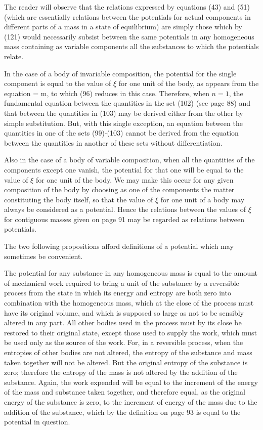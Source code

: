 \documentclass[12pt]{article}
\begin{document}
The reader will observe that the relations expressed by equations (43) and (51) (which are essentially relations between the potentials for actual components in different parts of a mass in a state of equilibrium) are simply those which by (121) would necessarily subsist between the same potentials in any homogeneous mass containing as variable components all the substances to which the potentials relate.


In the case of a body of invariable composition, the potential for the single component is equal to the value of $\xi$ for one unit of the body, as appears from the equation
\eqs \xi= \mu m,  \label{122}\eqe
to which (96) reduces in this case. Therefore, when $n = 1$, the fundamental equation between the quantities in the set (102) (see page 88) and that between the quantities in (103) may be derived either from the other by simple substitution. But, with this single exception, an equation between the quantities in one of the sets (99)-(103) cannot be derived from the equation between the quantities in another of these sets without differentiation.


Also in the case of a body of variable composition, when all the quantities of the components except one vanish, the potential for that one will be equal to the value of $\xi$ for one unit of the body. We may make this occur for any given composition of the body by choosing as one of the components the matter constituting the body itself, so that the value of $\xi$ for one unit of a body may always be considered as a potential. Hence the relations between the values of $\xi$ for contiguous masses given on page 91 may be regarded as relations between potentials.


The two following propositions afford definitions of a potential
which may sometimes be convenient.


The potential for any substance in any homogeneous mass is equal to the amount of mechanical work required to bring a unit of the substance by a reversible process from the state in which its energy and entropy are both zero into combination with the homogeneous mass, which at the close of the process must have its original volume, and which is supposed so large as not to be sensibly altered in any part. All other bodies used in the process must by its close be restored to their original state, except those used to supply the work, which must be used only as the source of the work. For, in a reversible process, when the entropies of other bodies are not altered, the entropy of the substance and mass taken together will not be altered. But the original entropy of the substance is zero; therefore the entropy of the mass is not altered by the addition of the substance. Again, the work expended will be equal to the increment of the energy of the mass and substance taken together, and therefore equal, as the original energy of the substance is zero, to the increment of energy of the mass due to the addition of the substance, which by the definition on page 93 is equal to the potential in question.
\end{document}
